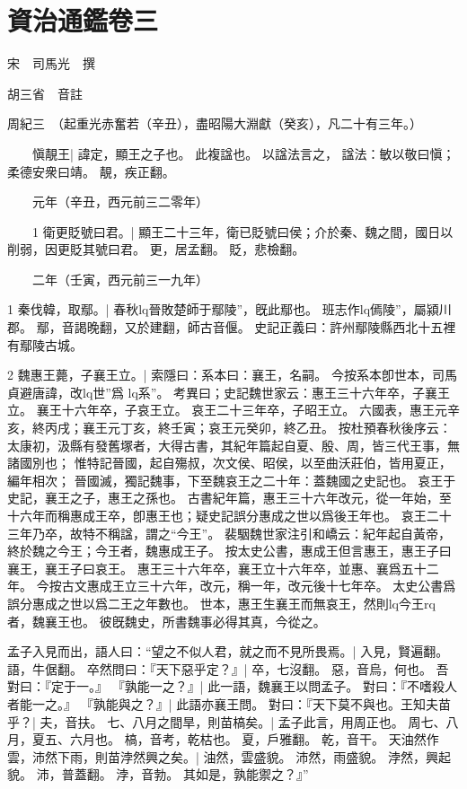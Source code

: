\chapter{資治通鑑卷三}

宋　司馬光　撰

胡三省　音註

周紀三　（起重光赤奮若（辛丑），盡昭陽大淵獻（癸亥），凡二十有三年。）

　　愼靚王|{
	諱定，顯王之子也。
	此複諡也。
	以諡法言之，
	諡法：敏以敬曰愼；柔德安衆曰靖。
	靚，疾正翻。
}


　　元年（辛丑，西元前三二零年）

　　1 衛更貶號曰君。|{
	顯王二十三年，衛已貶號曰侯；介於秦、魏之間，國日以削弱，因更貶其號曰君。
	更，居孟翻。
	貶，悲檢翻。
}

　　二年（壬寅，西元前三一九年）

1 秦伐韓，取鄢。|{
	春秋lq晉敗楚師于鄢陵”，旣此鄢也。
	班志作lq傿陵”，屬潁川郡。
	鄢，音謁晚翻，又於建翻，師古音偃。
	史記正義曰：許州鄢陵縣西北十五裡有鄢陵古城。
}

2 魏惠王薨，子襄王立。|{
	索隱曰：系本曰：襄王，名嗣。
	今按系本卽世本，司馬貞避唐諱，改lq世”爲 lq系”。
	考異曰；史記魏世家云：惠王三十六年卒，子襄王立。
	襄王十六年卒，子哀王立。
	哀王二十三年卒，子昭王立。
	六國表，惠王元辛亥，終丙戌；襄王元丁亥，終壬寅；哀王元癸卯，終乙丑。
	按杜預春秋後序云：太康初，汲縣有發舊塚者，大得古書，其紀年篇起自夏、殷、周，皆三代王事，無諸國別也；
	惟特記晉國，起自殤叔，次文侯、昭侯，以至曲沃莊伯，皆用夏正，編年相次；
	晉國滅，獨記魏事，下至魏哀王之二十年：蓋魏國之史記也。
	哀王于史記，襄王之子，惠王之孫也。
	古書紀年篇，惠王三十六年改元，從一年始，至十六年而稱惠成王卒，卽惠王也；疑史記誤分惠成之世以爲後王年也。
	哀王二十三年乃卒，故特不稱諡，謂之“今王”。
	裴駰魏世家注引和嶠云：紀年起自黃帝，終於魏之今王；今王者，魏惠成王子。
	按太史公書，惠成王但言惠王，惠王子曰襄王，襄王子曰哀王。
	惠王三十六年卒，襄王立十六年卒，並惠、襄爲五十二年。
	今按古文惠成王立三十六年，改元，稱一年，改元後十七年卒。
	太史公書爲誤分惠成之世以爲二王之年數也。
	世本，惠王生襄王而無哀王，然則lq今王rq者，魏襄王也。
	彼旣魏史，所書魏事必得其真，今從之。
}

	孟子入見而出，語人曰：“望之不似人君，就之而不見所畏焉。|{
	入見，賢遍翻。
	語，牛倨翻。
}
卒然問曰：『天下惡乎定？』|{
	卒，七沒翻。
	惡，音烏，何也。
}
吾對曰：『定于一。』
『孰能一之？』|{
	此一語，魏襄王以問孟子。
}
對曰：『不嗜殺人者能一之。』
『孰能與之？』|{
	此語亦襄王問。
}
對曰：『天下莫不與也。王知夫苗乎？|{
	夫，音扶。
}
七、八月之間旱，則苗槁矣。|{
	孟子此言，用周正也。
	周七、八月，夏五、六月也。
	槁，音考，乾枯也。
	夏，戶雅翻。
	乾，音干。
}
天油然作雲，沛然下雨，則苗浡然興之矣。|{
	油然，雲盛貌。
	沛然，雨盛貌。
	浡然，興起貌。
	沛，普蓋翻。
	浡，音勃。
}
其如是，孰能禦之？』”

